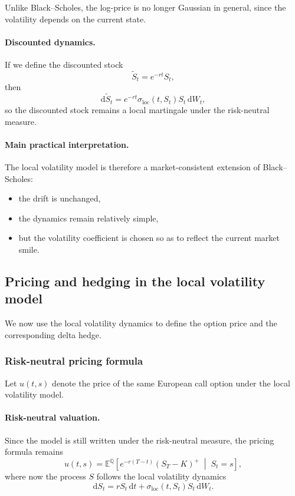 \documentclass[11pt]{article}
\newcommand{\Qbb}{\mathbb{Q}}
\newcommand{\E}{\mathbb{E}}
\theoremstyle{plain}
\theoremstyle{definition}
\theoremstyle{remark}
\begin{document}
Unlike Black--Scholes, the log-price is no longer Gaussian in general,
since the volatility depends on the current state.

\paragraph{Discounted dynamics.}
If we define the discounted stock
\[
\widetilde S_t=e^{-rt}S_t,
\]
then
\[
\mathrm{d}\widetilde S_t
=
e^{-rt}\sigma_{\mathrm{loc}}(t,S_t)S_t\,\mathrm{d}W_t,
\]
so the discounted stock remains a local martingale under the
risk-neutral measure.

\paragraph{Main practical interpretation.}
The local volatility model is therefore a market-consistent extension of
Black--Scholes:
\begin{itemize}[leftmargin=1.4em]
    \item the drift is unchanged,
    \item the dynamics remain relatively simple,
    \item but the volatility coefficient is chosen so as to reflect the
    current market smile.
\end{itemize}

\subsection{Pricing and hedging in the local volatility model}

We now use the local volatility dynamics to define the option price and
the corresponding delta hedge.

\subsubsection{Risk-neutral pricing formula}

Let \(u(t,s)\) denote the price of the same European call option under
the local volatility model.

\paragraph{Risk-neutral valuation.}
Since the model is still written under the risk-neutral measure, the
pricing formula remains
\[
\boxed{
u(t,s)
=
\E^\Qbb\!\left[
e^{-r(T-t)}(S_T-K)^+
\;\middle|\;
S_t=s
\right],
}
\]
where now the process \(S\) follows the local volatility dynamics
\[
\mathrm{d}S_t
=
rS_t\,\mathrm{d}t
+
\sigma_{\mathrm{loc}}(t,S_t)S_t\,\mathrm{d}W_t.
\]
\end{document}
